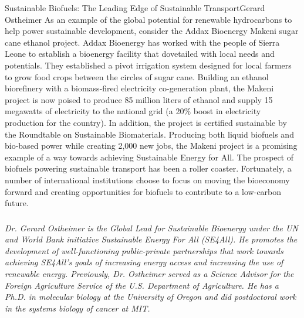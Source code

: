 \documentclass{papertex}
\begin{document}
\begin{news}{2}{Sustainable Biofuels: The Leading Edge of Sustainable 
    Transport}{Gerard Ostheimer}{}{}
As an example of the global potential for renewable hydrocarbons to help power 
sustainable development, consider the Addax Bioenergy Makeni sugar cane 
ethanol project. Addax Bioenergy has worked with the people of Sierra Leone 
to establish a bioenergy facility that dovetailed with local needs and 
potentials. They established a pivot irrigation system designed for local 
farmers to grow food crops between the circles of sugar cane. Building an 
ethanol biorefinery with a biomass-fired electricity co-generation plant, 
the Makeni project is now poised to produce 85 million liters of ethanol and 
supply 15 megawatts of electricity to the national grid (a 20\% boost in 
electricity production for the country). In addition, the project is certified 
sustainable by the Roundtable on Sustainable Biomaterials. Producing both 
liquid biofuels and bio-based power while creating 2,000 new jobs, the Makeni 
project is a promising example of a way towards achieving Sustainable Energy 
for All. The prospect of biofuels powering sustainable transport has been a 
roller coaster. Fortunately, a number of international institutions choose to 
focus on moving the bioeconomy forward and creating opportunities for biofuels 
to contribute to a low-carbon future.


\subsubsection*{}

\emph{Dr. Gerard Ostheimer is the Global Lead for Sustainable Bioenergy under 
the UN and World Bank initiative Sustainable Energy For All (SE4All). He 
promotes the development of well-functioning public-private partnerships that 
work towards achieving SE4All’s goals of increasing energy access and 
increasing the use of renewable energy. Previously, Dr. Ostheimer served as 
a Science Advisor for the Foreign Agriculture Service of the U.S. Department 
of Agriculture. He has a Ph.D. in molecular biology at the University of 
Oregon and did postdoctoral work in the systems biology of cancer at MIT.}

\end{news}
\end{document}
